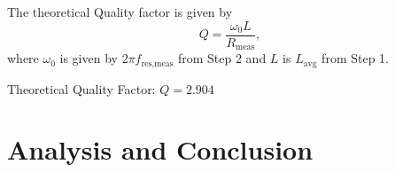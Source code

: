 \documentclass[twocolumn,english]{IEEEtran}
\theoremstyle{plain}
\theoremstyle{plain}
\begin{document}
The theoretical Quality factor is given by
\begin{equation}
	Q = \frac{\omega_0 L}{R_{\text{meas}}},
\end{equation}
where $\omega_0$ is given by $2\pi f_{\text{res,meas}}$ from Step 2 and $L$ is $L_{\text{avg}}$ from Step 1.

Theoretical Quality Factor: \underline{$Q = 2.904$}

\hrulefill

\section{Analysis and Conclusion}

%
%
\end{document}
